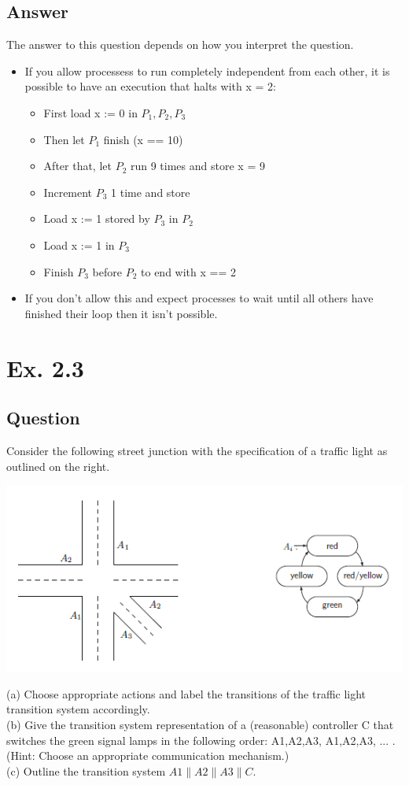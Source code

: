 \documentclass[12pt]{article}
\begin{document}
\subsection*{Answer}
The answer to this question depends on how you interpret the question.\\
\begin{itemize}
	\item If you allow processess to run completely independent from each other, it is possible to have an execution that halts with x = 2:
	\begin{itemize}
		\item First load x := 0 in $P_1, P_2, P_3$
		\item Then let $P_1$ finish (x == 10)
		\item After that, let $P_2$ run 9 times and store x = 9
		\item Increment $P_3$ 1 time and store
		\item Load x := 1 stored by $P_3$ in $P_2$ 
		\item Load x := 1 in $P_3$
		\item Finish $P_3$ before $P_2$ to end with x == 2
	\end{itemize}
	\item If you don't allow this and expect processes to wait until all others have finished their loop then it isn't possible.
\end{itemize}


\newpage
\section*{Ex. 2.3}
\subsection*{Question}
Consider the following street junction with the specification of a traffic light as
outlined on the right.\\
\begin{centering}
	\includegraphics*[width=\linewidth]{ex23.png}
\end{centering}
(a) Choose appropriate actions and label the transitions of the traffic light transition system
accordingly.\\
(b) Give the transition system representation of a (reasonable) controller C that switches the
green signal lamps in the following order: A1,A2,A3, A1,A2,A3, ... .\\
(Hint: Choose an appropriate communication mechanism.)\\
(c) Outline the transition system $A1\|A2\|A3\|C$.
\end{document}
